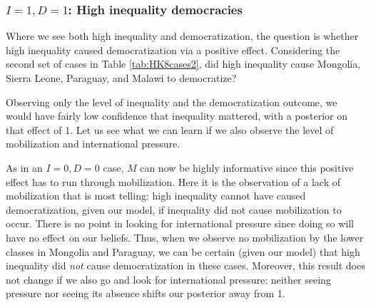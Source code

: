 \documentclass[
  12pt,
]{book}
\begin{document}
\hypertarget{i1-d1-high-inequality-democracies}{%
\subsubsection{\texorpdfstring{\(I=1, D=1\): High inequality democracies}{I=1, D=1: High inequality democracies}}\label{i1-d1-high-inequality-democracies}}

Where we see both high inequality and democratization, the question is whether high inequality caused democratization via a positive effect. Considering the second set of cases in Table \ref{tab:HK8cases2}, did high inequality cause Mongolia, Sierra Leone, Paraguay, and Malawi to democratize?

Observing only the level of inequality and the democratization outcome, we would have fairly low confidence that inequality mattered, with a posterior on that effect of 1. Let us see what we can learn if we also observe the level of mobilization and international pressure.

As in an \(I=0, D=0\) case, \(M\) can now be highly informative since this positive effect has to run through mobilization. Here it is the observation of a lack of mobilization that is most telling: high inequality cannot have caused democratization, given our model, if inequality did not cause mobilization to occur. There is no point in looking for international pressure since doing so will have no effect on our beliefs. Thus, when we observe no mobilization by the lower classes in Mongolia and Paraguay, we can be certain (given our model) that high inequality did \emph{not} cause democratization in these cases. Moreover, this result does not change if we also go and look for international pressure: neither seeing pressure nor seeing its absence shifts our posterior away from 1.

\begin{table}

\caption{\label{tab:HK8cases2}Four cases with high inequality and  democratization. Question of interest: Was high inequality a cause of democratization? Table shows posterior beliefs for different data for 4 cases given information on $M$ or $P$. Data from Haggard and Kaufman (2012). Analyses here use priors assuming only monotonic effects.}
\centering
{}
\end{table}
\end{document}
